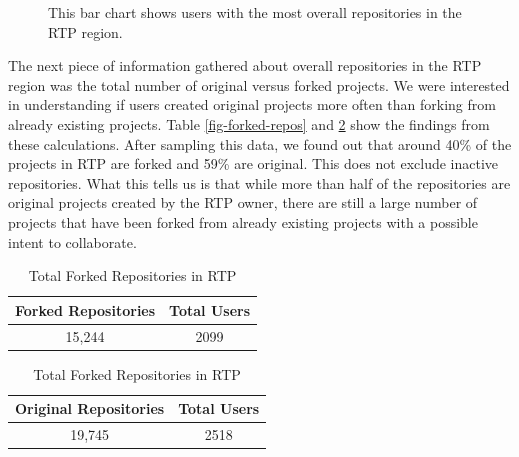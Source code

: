 \begin{figure}
\caption{This bar chart shows users with the most overall repositories in the RTP region.}
\label{fig-repoCountByUser-highest}
\end{figure}
             
The next piece of information gathered about overall repositories in the RTP region was the total number of original versus forked projects. We were interested in understanding if users created original projects more often than forking from already existing projects. Table \ref{fig-forked-repos} and \ref{fig-orig-repos} show the findings from these calculations. After sampling this data, we found out that around 40\% of the projects in RTP are forked and 59\% are original. This does not exclude inactive repositories. What this tells us is that while more than half of the repositories are original projects created by the RTP owner, there are still a large number of projects that have been forked from already existing projects with a possible intent to collaborate.

\begin{table}
\parbox{.45\linewidth}{
\centering
\begin{tabular}{|c|c|}
\hline
Forked Repositories & Total Users\\
\hline
15,244 & 2099\\
\hline
\end{tabular}
\caption{Total Original Repositories in RTP}
\label{fig-forked-repos}
}
\hfill
\parbox{.45\linewidth}{
\centering
\begin{tabular}{|c|c|}
\hline
Original Repositories & Total Users\\
\hline
19,745 & 2518\\
\hline
\end{tabular}
\caption{Total Forked Repositories in RTP}
\label{fig-orig-repos}
}
\end{table}

